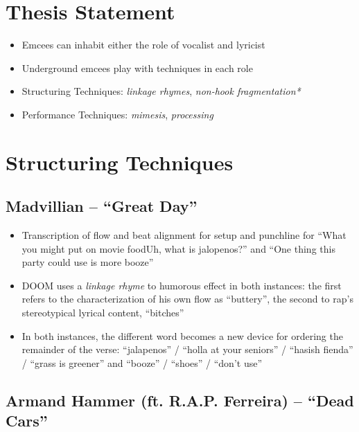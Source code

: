 \section{Thesis Statement}
    \begin{itemize}
        \item Emcees can inhabit either the role of vocalist and lyricist
        \item Underground emcees play with techniques in each role
        \item Structuring Techniques: \emph{linkage rhymes}, \emph{non-hook fragmentation*}
        \item Performance Techniques: \emph{mimesis}, \emph{processing}
    \end{itemize}

\section{Structuring Techniques}

\subsection*{\centering Madvillian -- ``Great Day''}

\begin{itemize}
    \item Transcription of flow and beat alignment for setup and punchline for ``What you might put on 
    movie food\textellipsis Uh, what is jalopenos?'' and ``One thing this party could use is more\textellipsis
    booze''
    \item DOOM uses a \emph{linkage rhyme} to humorous effect in both instances: the first refers to 
    the characterization of his own flow as ``buttery'', the second to rap's stereotypical lyrical content,
    ``bitches''
    \item In both instances, the different word becomes a new device for ordering the remainder of the 
    verse: ``jalapenos'' / ``holla at your seniors'' / ``hasish fienda'' / ``grass is greener'' and 
    ``booze'' / ``shoes'' / ``don't use''
\end{itemize}

\subsection*{\centering Armand Hammer (ft. R.A.P. Ferreira) -- ``Dead Cars''}


